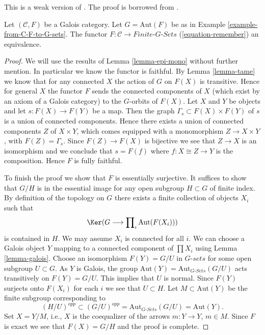 \begin{proposition}
\label{proposition-galois}
\begin{reference}
This is a weak version of \cite[Expos\'e V]{SGA1}.
The proof is borrowed from \cite[Theorem 7.2.5]{BS}.
\end{reference}
Let $(\mathcal{C}, F)$ be a Galois category. Let $G = \text{Aut}(F)$
be as in Example \ref{example-from-C-F-to-G-sets}. The functor
$F : \mathcal{C} \to \textit{Finite-}G\textit{-Sets}$
(\ref{equation-remember}) an equivalence.
\end{proposition}

\begin{proof}
We will use the results of Lemma \ref{lemma-epi-mono} without further mention.
In particular we know the functor is faithful.
By Lemma \ref{lemma-tame} we know that for any connected $X$ the
action of $G$ on $F(X)$ is transitive. Hence for general $X$ the functor
$F$ sends the connected components of $X$ (which exist by
an axiom of a Galois category) to the $G$-orbits of $F(X)$.
Let $X$ and $Y$ be objects and let
$s : F(X) \to F(Y)$ be a map. Then the graph
$\Gamma_s \subset F(X) \times F(Y)$ of $s$
is a union of connected components. Hence there exists a
union of connected components $Z$ of $X \times Y$,
which comes equipped with a monomorphism $Z \to X \times Y$,
with $F(Z) = \Gamma_s$. Since $F(Z) \to F(X)$ is bijective
we see that $Z \to X$ is an isomorphism and we conclude
that $s = F(f)$ where $f : X \cong Z \to Y$ is the composition.
Hence $F$ is fully faithful.

\medskip\noindent
To finish the proof we show that $F$ is essentially surjective.
It suffices to show that $G/H$ is in the essential image for
any open subgroup $H \subset G$ of finite index.
By definition of the topology on $G$ there exists a finite
collection of objects $X_i$ such that
$$
\Ker(G \longrightarrow \prod\nolimits_i \text{Aut}(F(X_i)))
$$
is contained in $H$. We may assume $X_i$ is connected
for all $i$. We can choose a Galois object $Y$ mapping
to a connected component of $\prod X_i$ using
Lemma \ref{lemma-galois}. Choose an isomorphism $F(Y) = G/U$
in $G\textit{-sets}$ for some open subgroup $U \subset G$.
As $Y$ is Galois, the group
$\text{Aut}(Y) = \text{Aut}_{G\textit{-Sets}}(G/U)$ acts transitively
on $F(Y) = G/U$. This implies that $U$ is normal. Since
$F(Y)$ surjects onto $F(X_i)$ for each $i$ we see that
$U \subset H$. Let $M \subset \text{Aut}(Y)$ be the finite subgroup
corresponding to
$$
(H/U)^{opp} \subset (G/U)^{opp} = \text{Aut}_{G\textit{-Sets}}(G/U)
= \text{Aut}(Y).
$$
Set $X = Y/M$, i.e., $X$ is the coequalizer
of the arrows $m : Y \to Y$, $m \in M$.
Since $F$ is exact we see that $F(X) = G/H$ and the
proof is complete.
\end{proof}